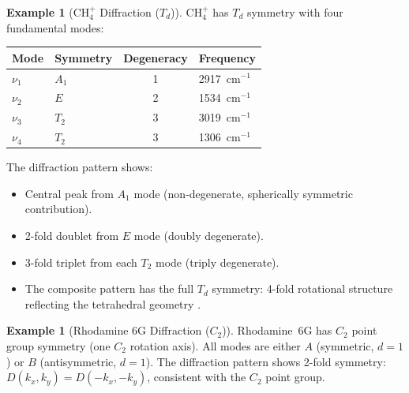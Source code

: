 \documentclass[11pt,twocolumn,a4paper]{article}
\theoremstyle{definition}
\newtheorem{example}[theorem]{Example}
\theoremstyle{remark}
\begin{document}
\begin{example}[CH$_4^+$ Diffraction ($T_d$)]
\label{ex:ch4_diffraction}
CH$_4^+$ has $T_d$ symmetry with four fundamental modes:
\begin{center}
\begin{tabular}{llcl}
\toprule
Mode & Symmetry & Degeneracy & Frequency \\
\midrule
$\nu_1$ & $A_1$ & 1 & 2917~cm$^{-1}$ \\
$\nu_2$ & $E$ & 2 & 1534~cm$^{-1}$ \\
$\nu_3$ & $T_2$ & 3 & 3019~cm$^{-1}$ \\
$\nu_4$ & $T_2$ & 3 & 1306~cm$^{-1}$ \\
\bottomrule
\end{tabular}
\end{center}
The diffraction pattern shows:
\begin{itemize}
  \item Central peak from $A_1$ mode (non-degenerate, spherically symmetric contribution).
  \item 2-fold doublet from $E$ mode (doubly degenerate).
  \item 3-fold triplet from each $T_2$ mode (triply degenerate).
  \item The composite pattern has the full $T_d$ symmetry: 4-fold rotational structure reflecting the tetrahedral geometry \citep{cotton1990, harris2003}.
\end{itemize}
\end{example}

\begin{example}[Rhodamine 6G Diffraction ($C_2$)]
\label{ex:rhodamine_diffraction}
Rhodamine~6G has $C_2$ point group symmetry (one $C_2$ rotation axis). All modes are either $A$ (symmetric, $d=1$) or $B$ (antisymmetric, $d=1$). The diffraction pattern shows 2-fold symmetry: $D(k_x, k_y) = D(-k_x, -k_y)$, consistent with the $C_2$ point group.
\end{example}
\end{document}
